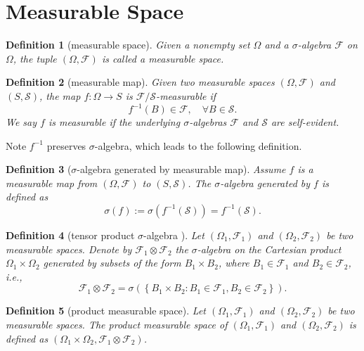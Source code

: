 \documentclass{report}
\newtheorem{definition}{Definition}[section]
\theoremstyle{nonumberplain}
\begin{document}
\section{Measurable Space}
\begin{definition}[measurable space]
	Given a nonempty set $\Omega$ and a $\sigma$-algebra $\mathcal{F}$ on  $\Omega$, the tuple $(\Omega,\mathcal{F})$ is called a \emph{measurable space}.
\end{definition}

\begin{definition}[measurable map]
	Given two measurable spaces $(\Omega,\mathcal{F})$ and $(S,\mathcal{S})$, the map $f:\Omega\to S$ is $\mathcal{F}/\mathcal{S}$-\emph{measurable} if
	\[
	f^{-1}(B)\in\mathcal{F},\quad\forall B\in\mathcal{S} .
	\]
	We say $f$ is measurable if the underlying $\sigma$-algebras $\mathcal{F}$ and $\mathcal{S}$ are self-evident. 
\end{definition}
Note $f^{-1}$ preserves $\sigma$-algebra, which leads to the following definition.

\begin{definition}[$\sigma$-algebra generated by measurable map]
	Assume $f$ is a measurable map from $(\Omega,\mathcal{F})$ to $(S,\mathcal{S})$. The $\sigma$-algebra generated by $f$ is defined as
	\[
	\sigma(f):=\sigma\left(f^{-1}(\mathcal{S})\right)=f^{-1}(\mathcal{S}).
	\]
\end{definition}

\begin{definition}[tensor product $\sigma$-algebra ]
	Let $(\Omega_1,\mathcal{F}_1)$ and $(\Omega_2,\mathcal{F}_2)$ be two measurable spaces. Denote by $\mathcal{F}_1\otimes\mathcal{F}_2$ the $\sigma$-algebra on the Cartesian product $\Omega_1\times\Omega_2$ generated by subsets of the form $B_1\times B_2$, where $B_{1}\in\mathcal{F}_1$ and $B_{2}\in\mathcal{F}_2$, i.e., 
	\[
	\mathcal{F}_{1} \otimes \mathcal{F}_{2} = \sigma\left(\left\{B_{1} \times B_{2}: B_{1} \in \mathcal{F}_{1}, B_{2} \in \mathcal{F}_{2}\right\}\right).
	\]
\end{definition}

\begin{definition}[product measurable space]
	Let $(\Omega_1,\mathcal{F}_1)$ and $(\Omega_2,\mathcal{F}_2)$ be two measurable spaces. The \emph{product measurable space} of $(\Omega_1,\mathcal{F}_1)$ and $(\Omega_2,\mathcal{F}_2)$ is defined as $(\Omega_1\times\Omega_2,\mathcal{F}_1\otimes\mathcal{F}_2)$. 
\end{definition}
\end{document}
